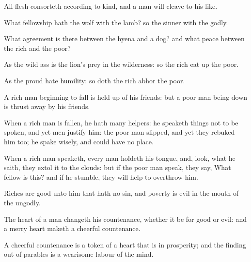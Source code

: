 {\par }{\PP {}All flesh consorteth according to kind, and a man will cleave to his like.
\par }{\PP {}What fellowship hath the wolf with the lamb? so the sinner with the godly.
\par }{\PP {}What agreement is there between the hyena and a dog? and what peace between the rich and the poor?
\par }{\PP {}As the wild ass is the lion’s prey in the wilderness: so the rich eat up the poor.
\par }{\PP {}As the proud hate humility: so doth the rich abhor the poor.
\par }{\PP {}A rich man beginning to fall is held up of his friends: but a poor man being down is thrust away by his friends.
\par }{\PP {}When a rich man is fallen, he hath many helpers: he speaketh things not to be spoken, and yet men justify him: the poor man slipped, and yet they rebuked him too; he spake wisely, and could have no place.
\par }{\PP {}When a rich man speaketh, every man holdeth his tongue, and, look, what he saith, they extol it to the clouds: but if the poor man speak, they say, What fellow is this? and if he stumble, they will help to overthrow him.
\par }{\PP {}Riches are good unto him that hath no sin, and poverty is evil in the mouth of the ungodly.
\par }{\PP {}The heart of a man changeth his countenance, whether it be for good or evil: and a merry heart maketh a cheerful countenance.
\par }{\PP {}A cheerful countenance is a token of a heart that is in prosperity; and the finding out of parables is a wearisome labour of the mind.

}
